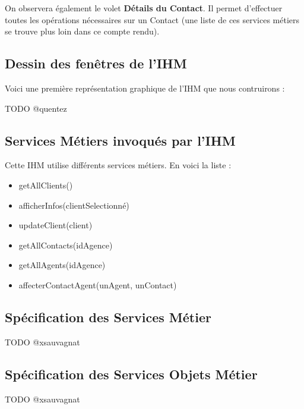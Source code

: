 On observera également le volet \textbf{Détails du Contact}. Il permet d'effectuer toutes les
opérations nécessaires sur un Contact (une liste de ces services métiers se trouve plus loin
dans ce compte rendu).

\subsection{Dessin des fenêtres de l'IHM}

Voici une première représentation graphique de l'IHM que nous contruirons :

TODO @quentez

\subsection{Services Métiers invoqués par l'IHM}

Cette IHM utilise différents services métiers. En voici la liste :

\begin{itemize}
\item getAllClients()
\item afficherInfos(clientSelectionné)
\item updateClient(client)
\item getAllContacts(idAgence)
\item getAllAgents(idAgence)
\item affecterContactAgent(unAgent, unContact)
\end{itemize}

\subsection{Spécification des Services Métier}

TODO @xsauvagnat

\subsection{Spécification des Services Objets Métier}

TODO @xsauvagnat
